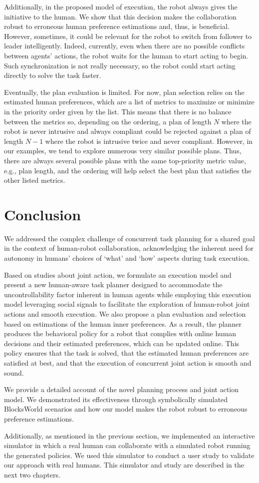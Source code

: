 Additionally, in the proposed model of execution, the robot always gives the initiative to the human. We show that this decision makes the collaboration robust to erroneous human preference estimations and, thus, is beneficial. However, sometimes, it could be relevant for the robot to switch from follower to leader intelligently. Indeed, currently, even when there are no possible conflicts between agents' actions, the robot waits for the human to start acting to begin. Such synchronization is not really necessary, so the robot could start acting directly to solve the task faster. 

Eventually, the plan evaluation is limited. For now, plan selection relies on the estimated human preferences, which are a list of metrics to maximize or minimize in the priority order given by the list. This means that there is no balance between the metrics so, depending on the ordering, a plan of length $N$ where the robot is never intrusive and always compliant could be rejected against a plan of length $N-1$ where the robot is intrusive twice and never compliant. 
However, in our examples, we tend to explore numerous very similar possible plans. Thus, there are always several possible plans with the same top-priority metric value, e.g., plan length, and the ordering will help select the best plan that satisfies the other listed metrics.   

\section{Conclusion}

We addressed the complex challenge of concurrent task planning for a shared goal in the context of human-robot collaboration, acknowledging the inherent need for autonomy in humans' choices of `what' and `how' aspects during task execution. 

Based on studies about joint action, we formulate an execution model and present a new human-aware task planner designed to accommodate the uncontrollability factor inherent in human agents while employing this execution model leveraging social signals to facilitate the exploration of human-robot joint actions and smooth execution. 
We also propose a plan evaluation and selection based on estimations of the human inner preferences.
As a result, the planner produces the behavioral policy for a robot that complies with online human decisions and their estimated preferences, which can be updated online. This policy 
ensures that the task is solved, that the estimated human preferences are satisfied at best, and that the execution of concurrent joint action is smooth and sound.

We provide a detailed account of the novel planning process and joint action model. We demonstrated its effectiveness through symbolically simulated BlocksWorld scenarios and how our model makes the robot robust to erroneous preference estimations.

Additionally, as mentioned in the previous section, we implemented an interactive simulator in which a real human can collaborate with a simulated robot running the generated policies. We used this simulator to conduct a user study to validate our approach with real humans. This simulator and study are described in the next two chapters.  
